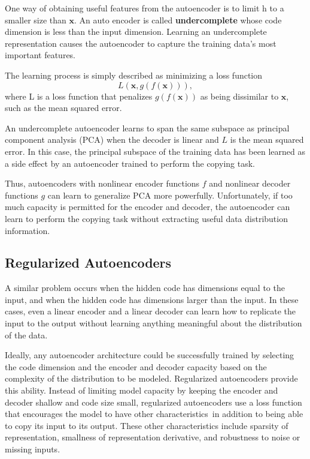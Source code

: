 One way of obtaining useful features from the autoencoder is to limit h to a
smaller size than $\textbf{x}$. An auto encoder is called \textbf{undercomplete} whose
code dimension is less than the input dimension. Learning an undercomplete
representation causes the autoencoder to capture the training data's most
important features. 

The learning process is simply described as minimizing a loss function 
\begin{equation}
    L(\textbf{x}, g(f(\textbf{x}))),
\end{equation}
where L is a loss function that penalizes $g(f(\textbf{x}))$ as being dissimilar
to $\textbf{x}$, such as the mean squared error. 

An undercomplete autoencoder learns to span the same subspace as principal
component analysis (PCA) when the decoder is linear and $L$ is the mean squared
error. In this case, the principal subspace of the training data has been
learned as a side effect by an autoencoder trained to perform the copying task.

Thus, autoencoders with nonlinear encoder functions $f$ and nonlinear decoder
functions $g$ can learn to generalize PCA more powerfully. Unfortunately, if too
much capacity is permitted for the encoder and decoder, the autoencoder can
learn to perform the copying task without extracting useful data distribution
information. 

\subsection{Regularized Autoencoders}
A similar problem occurs when the hidden code has dimensions equal to the input,
and when the hidden code has dimensions larger than the input. In these cases,
even a linear encoder and a linear decoder can learn how to replicate the input
to the output without learning anything meaningful about the distribution of
the data. 

Ideally, any autoencoder architecture could be successfully trained by selecting
the code dimension and the encoder and decoder capacity based on the complexity
of the distribution to be modeled. Regularized autoencoders provide this
ability. Instead of limiting model capacity by keeping the encoder and decoder
shallow and code size small, regularized autoencoders use a loss function that
encourages the model to have other characteristics in addition to being able to
copy its input to its output. These other characteristics include sparsity of
representation, smallness of representation derivative, and robustness to noise
or missing inputs. 

